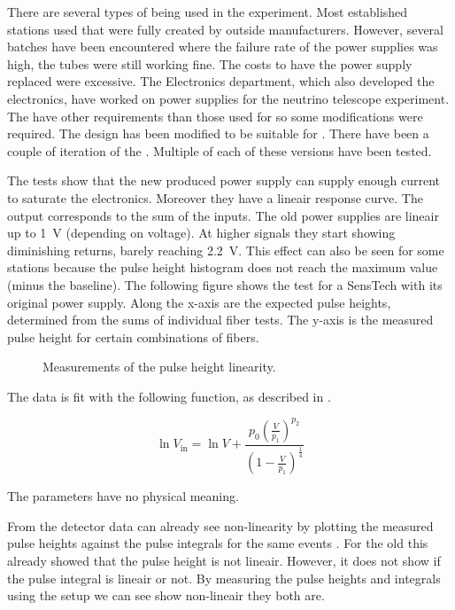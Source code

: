 There are several types of \pmt being used in the \hisparc experiment. Most established stations used \pmts that were fully created by outside manufacturers. However, several batches have been encountered where the failure rate of the \pmt power supplies was high, the tubes were still working fine. The costs to have the power supply replaced were excessive. The \nikhef Electronics department, which also developed the \hisparc electronics, have worked on \pmt power supplies for the \kmnet neutrino telescope experiment. The \kmnet \pmts have other requirements than those used for \hisparc so some modifications were required. The \kmnet design has been modified to be suitable for \hisparc. There have been a couple of iteration of the \hisparc \pmts. Multiple \pmts of each of these versions have been tested.

The tests show that the new \nikhef produced \pmt power supply can supply enough current to saturate the \hisparc electronics. Moreover they have a lineair response curve. The output corresponds to the sum of the inputs. The old power supplies are lineair up to \SI{1}{\volt} (depending on voltage). At higher signals they start showing diminishing returns, barely reaching \SI{2.2}{\volt}. This effect can also be seen for some \hisparc stations because the pulse height histogram does not reach the maximum \adc value (minus the baseline). The following figure shows the test for a SensTech \pmt with its original power supply. Along the x-axis are the expected pulse heights, determined from the sums of individual fiber tests. The y-axis is the measured pulse height for certain combinations of fibers.

\begin{figure}
    \centering
    
    \caption{Measurements of the pulse height linearity.}
    \label{fig:linearity_senstech_ph}
\end{figure}

The data is fit with the following function, as described in
\cite{icecube:pmt}.

\begin{equation}
    \ln V_{\mathrm{in}} = \ln V +
                          \frac{p_0 \left(\frac{V}{p_1}\right)^{p_2}}
                               {\left(1 - \frac{V}{p_1}\right)^{\frac{1}{4}}}
\end{equation}

The parameters have no physical meaning.


From the detector data can already see non-linearity by plotting the measured pulse heights against the pulse integrals for the same events . For the old \pmts this already showed that the pulse height is not lineair. However, it does not show if the pulse integral is lineair or not. By measuring the pulse heights and integrals using the setup we can see show non-lineair they both are.

